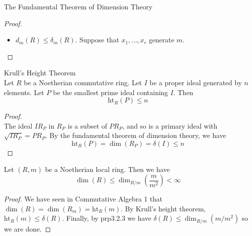 \documentclass[a4paper]{article}
\begin{document}
\begin{thm}{The Fundamental Theorem of Dimension Theory}{}
\begin{proof}
\begin{itemize}
Finally, under the surjective map $p$, $R/m^n$ is sent to $A/p(m)^n$. Hence $l(R/m^n)\geq l(A/p(m)^n)$ so that $d_m(R)\geq d_m(R/P_0)$. Then combining with the above inequality we deduce that $r-1\leq d_m(R/P_0)-1\leq d_m(R)-1$ so that $r\leq d_m(R)$. Since this is true for all chains of prime ideals of $R$, we deduce that $\dim(R)\leq d_m(R)$. \\~\\

\item $d_m(R)\leq\delta_m(R)$. Suppose that $x_1,\dots,x_r$ generate $m$. 
\end{itemize}
\end{proof}
\end{thm}

\begin{thm}{Krull's Height Theorem}{}\\
Let $R$ be a Noetherian commutative ring. Let $I$ be a proper ideal generated by $n$ elements. Let $P$ be the smallest prime ideal containing $I$. Then $$\text{ht}_R(P)\leq n$$
\begin{proof}\\
The ideal $IR_P$ in $R_P$ is a subset of $PR_P$, and so is a primary ideal with $\sqrt{IR_P}=PR_P$. By the fundamental theorem of dimension theory, we have $$\text{ht}_R(P)=\dim(R_P)=\delta(I)\leq n$$
\end{proof}
\end{thm}

\begin{prp}{}{} Let $(R,m)$ be a Noetherian local ring. Then we have $$\dim(R)\leq\dim_{R/m}\left(\frac{m}{m^2}\right)<\infty$$ 
\begin{proof}
We have seen in Commutative Algebra 1 that $\dim(R)=\dim(R_m)=\text{ht}_R(m)$. By Krull's height theorem, $\text{ht}_R(m)\leq\delta(R)$. Finally, by prp3.2.3 we have $\delta(R)\leq\dim_{R/m}(m/m^2)$ so we are done. 
\end{proof}
\end{prp}
\end{document}
